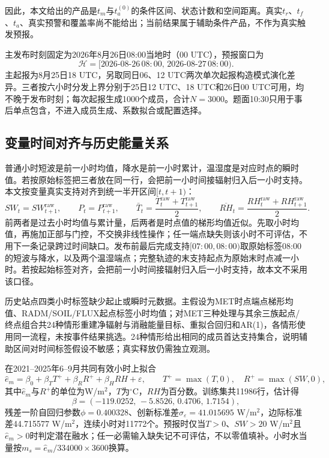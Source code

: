 因此，本文给出的产品是$t_m$与$t_a^{(0)}$的条件区间、状态计数和空间距离。真实$t_r$、$t_f$、$t_a$、真实预警和覆盖率尚不能给出；当前结果属于辅助条件产品，不作为真实触发预报。

主发布时刻固定为2026年8月26日08:00当地时（00 UTC），预报窗口为
\begin{equation}
\mathcal H=[2026\text{-}08\text{-}26\,08{:}00,\,
2026\text{-}08\text{-}27\,08{:}00).
\end{equation}
主起报为8月25日18 UTC，另取同日06、12 UTC两次单次起报构造模式演化差异。三者按六小时分发上界分别于25日12 UTC、18 UTC和26日00 UTC可用，均不晚于发布时刻；每次起报生成1000个成员，合计$N=3000$。题面10:30只用于事后单点包含，不进入成员生成、系数拟合或配置选择。

\subsection{变量时间对齐与历史能量关系}
普通小时短波是前一小时均值，降水是前一小时累计，温湿度是对应时点的瞬时值。若按原始标签把三者放在同一行，会把前一小时间接辐射归入后一小时支持。本文按变量真实支持对齐到统一半开区间$[t,t+1)$：
\begin{equation}
SW_t=SW^{\mathrm{raw}}_{t+1},\qquad
P_t=P^{\mathrm{raw}}_{t+1},\qquad
\bar T_t=\frac{T^{\mathrm{raw}}_{t}+T^{\mathrm{raw}}_{t+1}}{2},\qquad
\overline{RH}_t=\frac{RH^{\mathrm{raw}}_{t}+RH^{\mathrm{raw}}_{t+1}}{2}.
\label{eq:support}
\end{equation}
前两者是过去小时均值与累计量，后两者是时点值的梯形均值近似。先取小时均值，再施加正部与门控，不交换非线性操作；任一端点缺失则该小时不可评估，不用下一条记录跨过时间缺口。发布前最后完成支持$[07{:}00,08{:}00)$取原始标签08:00的短波与降水，以及两个温湿端点；完整轨迹的末支持起点为原始末时点减一小时。若按起始标签对齐，会把前一小时间接辐射归入后一小时支持，故本文不采用该口径。

历史站点四类小时标签缺少起止或瞬时元数据。主假设为MET时点端点梯形均值、RADM/SOIL/FLUX起点标签小时均值；对MET三种处理与其余三族起点/终点组合共24种情形重建净辐射与消融能量目标、重拟合回归和AR(1)，各情形使用同一流程，未按事件结果挑选。24种情形给出相同的成员首达支持集合，说明辅助区间对时间标签假设不敏感；真实释放仍需独立观测。

在2021--2025年6--9月共同有效小时上拟合
\begin{equation}
\hat e_m=\beta_0+\beta_T T^++\beta_R R^++\beta_H RH+\varepsilon,
\qquad
T^+=\max(T,0),\quad R^+=\max(SW,0),
\end{equation}
其中$\hat e_m$与$R^+$的单位为W/m$^2$，$T$为$^\circ$C，$RH$为百分数。训练集共11986行，估计得
\begin{equation}
\beta=(-119.0252,\,-5.8526,\,0.4706,\,1.7154),
\end{equation}
残差一阶自回归参数$\phi=0.400328$、创新标准差$\sigma_\varepsilon=41.015695$ W/m$^2$，边际标准差44.715577 W/m$^2$，连续小时对11772个。预报时仅当$T>0$、$SW>20$ W/m$^2$且$\hat e_m>0$时判定潜在融水；任一必需输入缺失记不可评估，不以零值填补。小时水当量按$m_s=\hat e_m/334000\times3600$换算。


